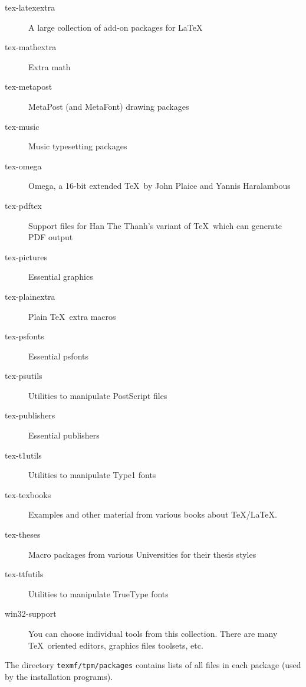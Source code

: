 \documentclass{article}
\begin{document}
\begin{description}
    \item[tex-latexextra]
      A large collection of add-on packages for \LaTeX\
    \item[tex-mathextra]
      Extra math
    \item[tex-metapost]
      MetaPost (and MetaFont) drawing packages
    \item[tex-music]
      Music typesetting packages
    \item[tex-omega]
      Omega, a 16-bit extended \TeX\ by John Plaice and Yannis Haralambous
    \item[tex-pdftex]
      Support files for Han The Thanh's variant of \TeX\ which can
generate PDF output
    \item[tex-pictures]
      Essential graphics
    \item[tex-plainextra]
      Plain \TeX\ extra macros
    \item[tex-psfonts]
      Essential psfonts
    \item[tex-psutils]
      Utilities to manipulate PostScript files
    \item[tex-publishers]
      Essential publishers
    \item[tex-t1utils]
      Utilities to manipulate Type1 fonts
    \item[tex-texbooks]
      Examples and other material from various books about TeX/LaTeX.
    \item[tex-theses]
      Macro packages from various Universities for their thesis styles
    \item[tex-ttfutils]
      Utilities to manipulate TrueType fonts
    \item[win32-support]
         You can choose individual tools from this collection.
         There are many \TeX\ oriented editors, graphics files
         toolsets, etc.
\end{description}

The directory \texttt{texmf/tpm/packages} contains lists 
of all files in each package (used by the installation programs).
\end{document}
